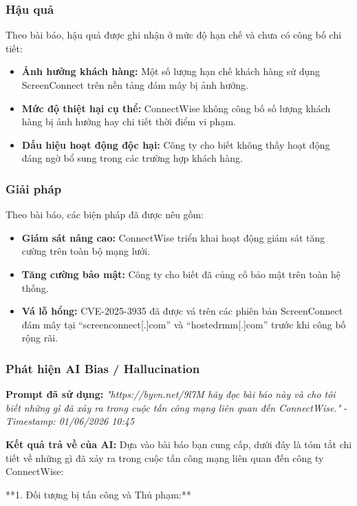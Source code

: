 \subsubsection{Hậu quả}
Theo bài báo, hậu quả được ghi nhận ở mức độ hạn chế và chưa có công bố chi tiết:

\begin{itemize}
    \item \textbf{Ảnh hưởng khách hàng:} Một số lượng hạn chế khách hàng sử dụng ScreenConnect trên nền tảng đám mây bị ảnh hưởng.
    \item \textbf{Mức độ thiệt hại cụ thể:} ConnectWise không công bố số lượng khách hàng bị ảnh hưởng hay chi tiết thời điểm vi phạm.
    \item \textbf{Dấu hiệu hoạt động độc hại:} Công ty cho biết không thấy hoạt động đáng ngờ bổ sung trong các trường hợp khách hàng.
\end{itemize}

\subsubsection{Giải pháp}
Theo bài báo, các biện pháp đã được nêu gồm:

\begin{itemize}
    \item \textbf{Giám sát nâng cao:} ConnectWise triển khai hoạt động giám sát tăng cường trên toàn bộ mạng lưới.
    \item \textbf{Tăng cường bảo mật:} Công ty cho biết đã củng cố bảo mật trên toàn hệ thống.
    \item \textbf{Vá lỗ hổng:} CVE-2025-3935 đã được vá trên các phiên bản ScreenConnect đám mây tại “screenconnect[.]com” và “hostedrmm[.]com” trước khi công bố rộng rãi.
\end{itemize}

\subsubsection{Phát hiện AI Bias / Hallucination}
\textbf{Prompt đã sử dụng:} \textit{"{https://byvn.net/9l7M} hãy đọc bài báo này và cho tôi biết những gì đã xảy ra trong cuộc tấn công mạng liên quan đến ConnectWise."} - \textit{Timestamp: 01/06/2026 10:45}

\textbf{Kết quả trả về của AI:}
Dựa vào bài báo bạn cung cấp, dưới đây là tóm tắt chi tiết về những gì đã xảy ra trong cuộc tấn công mạng liên quan đến công ty ConnectWise:

**1. Đối tượng bị tấn công và Thủ phạm:**

